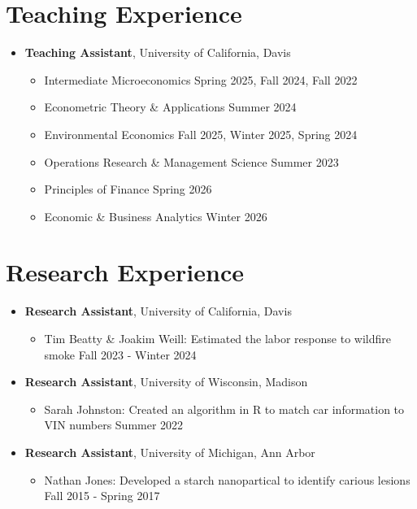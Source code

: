 \documentclass{article}[12]
\begin{document}
\section{Teaching Experience}

\begin{itemize}[itemsep=0.5em]
    
    \item \textbf{Teaching Assistant}, University of California, Davis
    \begin{itemize}
        \item Intermediate Microeconomics \hfill Spring 2025, Fall 2024, Fall 2022
        \item Econometric Theory \& Applications \hfill Summer 2024 
        \item Environmental Economics \hfill Fall 2025, Winter 2025, Spring 2024
        \item Operations Research \& Management Science \hfill Summer 2023
        \item Principles of Finance \hfill Spring 2026
        \item Economic \& Business Analytics \hfill Winter 2026

    \end{itemize}
    
\end{itemize}

\section{Research Experience}

\begin{itemize}[itemsep=0.5em]
    
    \item \textbf{Research Assistant}, University of California, Davis
    \begin{itemize}
        \item Tim Beatty \& Joakim Weill: Estimated the labor response to wildfire smoke \hfill Fall 2023 - Winter 2024 

    \end{itemize}

    \item \textbf{Research Assistant}, University of Wisconsin, Madison
    \begin{itemize}
        \item Sarah Johnston: Created an algorithm in R to match car information to VIN numbers \hfill Summer 2022
    \end{itemize}

    \item \textbf{Research Assistant}, University of Michigan, Ann Arbor
    \begin{itemize}
        \item Nathan Jones: Developed a starch nanopartical to identify carious lesions \hfill Fall 2015 - Spring 2017
    \end{itemize}
  
\end{itemize}
\end{document}
